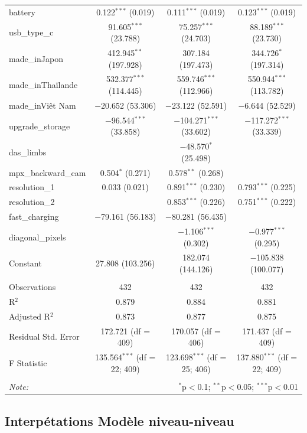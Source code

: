 \documentclass[
  12pt,
]{report}
\begin{document}
\begin{table}[!htbp]
\begin{tabular}{@{\extracolsep{5pt}}lccc}
  battery & 0.122$^{***}$ (0.019) & 0.111$^{***}$ (0.019) & 0.123$^{***}$ (0.019) \\ 
  usb\_type\_c & 91.605$^{***}$ (23.788) & 75.257$^{***}$ (24.703) & 88.189$^{***}$ (23.730) \\ 
  made\_inJapon & 412.945$^{**}$ (197.928) & 307.184 (197.473) & 344.726$^{*}$ (197.314) \\ 
  made\_inThaïlande & 532.377$^{***}$ (114.445) & 559.746$^{***}$ (112.966) & 550.944$^{***}$ (113.782) \\ 
  made\_inViêt Nam & $-$20.652 (53.306) & $-$23.122 (52.591) & $-$6.644 (52.529) \\ 
  upgrade\_storage & $-$96.544$^{***}$ (33.858) & $-$104.271$^{***}$ (33.602) & $-$117.272$^{***}$ (33.339) \\ 
  das\_limbs &  & $-$48.570$^{*}$ (25.498) &  \\ 
  mpx\_backward\_cam & 0.504$^{*}$ (0.271) & 0.578$^{**}$ (0.268) &  \\ 
  resolution\_1 & 0.033 (0.021) & 0.891$^{***}$ (0.230) & 0.793$^{***}$ (0.225) \\ 
  resolution\_2 &  & 0.853$^{***}$ (0.226) & 0.751$^{***}$ (0.222) \\ 
  fast\_charging & $-$79.161 (56.183) & $-$80.281 (56.435) &  \\ 
  diagonal\_pixels &  & $-$1.106$^{***}$ (0.302) & $-$0.977$^{***}$ (0.295) \\ 
  Constant & 27.808 (103.256) & 182.074 (144.126) & $-$105.838 (100.077) \\ 
 \hline \\[-1.8ex] 
Observations & 432 & 432 & 432 \\ 
R$^{2}$ & 0.879 & 0.884 & 0.881 \\ 
Adjusted R$^{2}$ & 0.873 & 0.877 & 0.875 \\ 
Residual Std. Error & 172.721 (df = 409) & 170.057 (df = 406) & 171.437 (df = 409) \\ 
F Statistic & 135.564$^{***}$ (df = 22; 409) & 123.698$^{***}$ (df = 25; 406) & 137.880$^{***}$ (df = 22; 409) \\ 
\hline 
\hline \\[-1.8ex] 
\textit{Note:}  & \multicolumn{3}{r}{$^{*}$p$<$0.1; $^{**}$p$<$0.05; $^{***}$p$<$0.01} \\ 
\end{tabular} 
\end{table}

\newpage

\subsection{Interpétations Modèle
niveau-niveau}\label{interpuxe9tations-moduxe8le-niveau-niveau}
\end{document}
